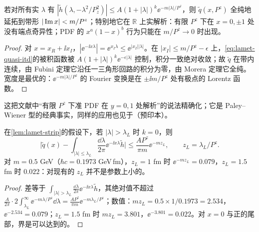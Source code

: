 \begin{lemma}\label{lem:lamet-strip}
若对所有实 $\lambda$ 有 $|\tilde h(\lambda,-\lambda^2/P_z^2)|\le A(1+|\lambda|)^k\ee^{-m|\lambda|/P^z}$，则 $\tilde q(x,P^z)$ 全纯地延拓到带形 $|\operatorname{Im} x|<m/P^z$；特别地它在 $\mathbb R$ 上实解析：有限 $P^z$ 下在 $x=0,\pm1$ 处没有端点奇异性；PDF 的 $x^a(1-x)^b$ 行为只能在 $m/P^z\to0$ 时出现。%
\end{lemma}

\begin{proof}
对 $x=x_R+\ii x_I$，$|\ee^{-\ii x\lambda}|=\ee^{x_I\lambda}\le\ee^{|x_I||\lambda|}$。在 $|x_I|\le m/P^z-\epsilon$ 上，\cref{eq:lamet-quasi-itd}的被积函数被 $A(1+|\lambda|)^k\ee^{-\epsilon|\lambda|}$ 控制，积分一致绝对收敛；故 $\tilde q$ 在带内连续，由 Fubini 定理它沿任一三角形回路的积分为零，由 Morera 定理它全纯。宽度是最优的：$\ee^{-m|\lambda|/P^z}$ 的 Fourier 变换是在 $\pm\ii m/P^z$ 处有极点的 Lorentz 函数。
\end{proof}

这把文献\cite{Ji:2024oka}中“有限 $P^z$ 下准 PDF 在 $y=0,1$ 处解析”的说法精确化；它是 Paley--Wiener 型的经典事实，同样的应用也见于\cite{Monahan:2026skv}（预印本）。

\begin{proposition}\label{prop:lamet-truncation}
在\cref{lem:lamet-strip}的假设下，若 $|\lambda|>\lambda_L$ 时 $k=0$，则
\begin{equation}\label{eq:lamet-truncation}
\Big|\tilde q(x)-\int_{|\lambda|\le\lambda_L}\frac{\dd\lambda}{2\pi}\ee^{-\ii x\lambda}\tilde h\Big|\le\frac{AP^z}{\pi m}\ee^{-mz_L},\qquad z_L=\lambda_L/P^z .
\end{equation}%
对 $m=0.5$ GeV（$\hbar c=0.1973$ GeV\,fm），$z_L=1$ fm 时 $\ee^{-mz_L}=0.079$，$z_L=1.5$ fm 时 $0.022$：对现有的 $z_L$ 并不是参数上小的。
\end{proposition}

\begin{proof}
差等于 $\int_{|\lambda|>\lambda_L}\frac{\dd\lambda}{2\pi}\ee^{-\ii x\lambda}\tilde h$，其绝对值不超过 $\frac A{2\pi}\cdot2\int_{\lambda_L}^\infty\ee^{-m\lambda/P^z}\dd\lambda=\frac{AP^z}{\pi m}\ee^{-m\lambda_L/P^z}$；数值：$mz_L=0.5\times1/0.1973=2.534$，$\ee^{-2.534}=0.079$；$z_L=1.5$ fm 时 $mz_L=3.801$，$\ee^{-3.801}=0.022$。对 $x=0$ 与正的尾部，界是可以达到的。
\end{proof}

